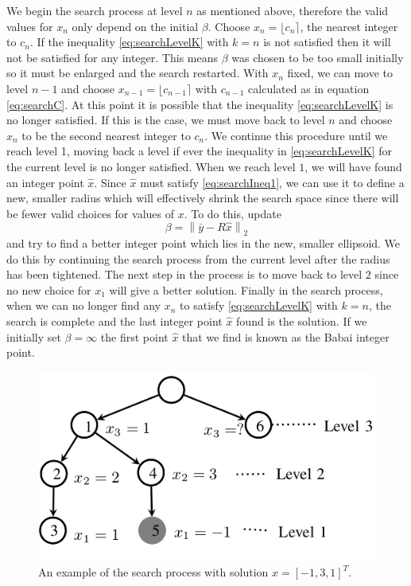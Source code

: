 \documentclass[12pt,Bold,letterpaper]{mcgilletdclass}
\begin{document}
We begin the search process
at level $n$ as mentioned above, therefore the valid values for $x_n$ only depend on the initial $\beta$. Choose $x_n = \lfloor c_n \rceil$, the nearest integer to $c_n$. If the inequality \eqref{eq:searchLevelK} with $k=n$
is not satisfied then it will not be satisfied for any integer. This means $\beta$
was chosen to be too small initially so it must be enlarged and the search restarted. With $x_n$ fixed, we can move
to level $n-1$ and choose $x_{n-1} = \lfloor c_{n-1} \rceil$ with $c_{n-1}$ calculated as in equation \eqref{eq:searchC}. At this point it is possible that the inequality \eqref{eq:searchLevelK} is no longer satisfied. If this is the case, we must move back to level $n$ and choose $x_n$ to be the second nearest integer to $c_n$.  We continue this procedure until we reach
level 1, moving back a level if ever the inequality in \eqref{eq:searchLevelK} for the current level is no longer satisfied. When we reach level $1$, we will have found an integer point $\hat{x}$. Since $\hat{x}$ must satisfy \eqref{eq:searchIneq1}, we can use it to define a new, smaller radius which will effectively shrink the search space since there will be fewer valid choices for values of $x$.  To do this, update $$\beta = \left \| \bar{y} - R\hat{x} \right \|_2$$ and try to find a better integer point which lies in the new, smaller ellipsoid. We do this by continuing the search process from the current level after the radius has been tightened. The next step in the process is to move back to level $2$ since no new choice for $x_1$ will give a better solution. Finally in the search process, when we can no longer find any $x_n$ to satisfy \eqref{eq:searchLevelK} with $k=n$, the search is complete and the last integer point $\hat{x}$ found is the solution. If we initially set $\beta = \infty$ the first point $\hat{x}$ that we find is known as the Babai integer point.

\begin{figure}
\centering
\includegraphics[scale=0.5]{searchtree.png}
\caption{An example of the search process with solution $x = [-1,3,1]^T$.}
\label{fig:treeSearch}
\end{figure}
\end{document}
